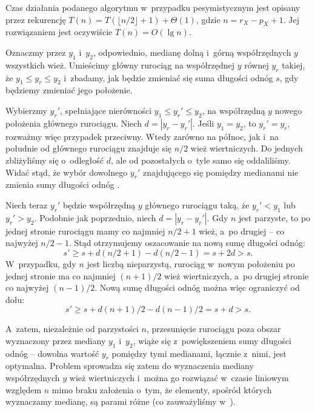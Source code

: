 Czas działania podanego algorytmu w~przypadku pesymistycznym jest opisany przez rekurencję $T(n)=T(\lfloor n/2\rfloor+1)+\Theta(1)$, gdzie $n=r_X-p_X+1$.
Jej rozwiązaniem jest oczywiście $T(n)=O(\lg n)$.

\exercise %
Oznaczmy przez $y_1$ i~$y_2$, odpowiednio, medianę dolną i~górną współrzędnych $y$ wszystkich wież.
Umieścimy główny rurociąg na współrzędnej $y$ równej $y_r$ takiej, że $y_1\le y_r\le y_2$ i~zbadamy, jak będzie zmieniać się suma długości odnóg  $s$, gdy będziemy zmieniać jego położenie.

Wybierzmy $y_r'$, spełniające nierówności $y_1\le y_r'\le y_2$, na współrzędną $y$ nowego położenia głównego rurociągu.
Niech $d=|y_r-y_r'|$.
Jeśli $y_1=y_2$, to $y_r'=y_r$, rozważmy więc przypadek przeciwny.
Wtedy zarówno na północ, jak i~na południe od głównego rurociągu znajduje się $n/2$ wież wiertniczych.
Do jednych zbliżyliśmy się o~odległość $d$, ale od pozostałych o~tyle samo się oddaliliśmy.
Widać stąd, że wybór dowolnego $y_r'$ znajdującego się pomiędzy medianami nie zmienia sumy długości odnóg .

Niech teraz $y_r'$ będzie współrzędną $y$ głównego rurociągu taką, że $y_r'<y_1$ lub $y_r'>y_2$.
Podobnie jak poprzednio, niech $d=|y_r-y_r'|$.
Gdy $n$ jest parzyste, to po jednej stronie rurociągu mamy co najmniej $n/2+1$ wież, a~po drugiej -- co najwyżej $n/2-1$.
Stąd otrzymujemy oszacowanie na nową sumę długości odnóg:
\[
    s' \ge s+d(n/2+1)-d(n/2-1) = s+2d > s.
\]
W~przypadku, gdy $n$ jest liczbą nieparzystą, rurociąg w~nowym położeniu po jednej stronie ma co najmniej $(n+1)/2$ wież wiertniczych, a~po drugiej stronie co najwyżej $(n-1)/2$.
Nową sumę długości odnóg można więc ograniczyć od dołu:
\[
    s' \ge s+d(n+1)/2-d(n-1)/2 = s+d > s.
\]

A~zatem, niezależnie od parzystości $n$, przesunięcie rurociągu poza obszar wyznaczony przez mediany $y_1$ i~$y_2$, wiąże się z~powiększeniem sumy długości odnóg  -- dowolna wartość $y_r$ pomiędzy tymi medianami, łącznie z~nimi, jest optymalna.
Problem sprowadza się zatem do wyznaczenia mediany współrzędnych $y$ wież wiertniczych i~można go rozwiązać w~czasie liniowym względem $n$ mimo braku założenia o~tym, że elementy, spośród których wyznaczamy medianę, są parami różne (co zauważyliśmy w~).
